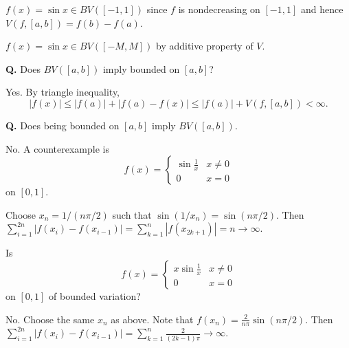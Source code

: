 \documentclass{notes}
\begin{document}
  \begin{eg}
    $f(x) = \sin x \in BV([-1, 1])$ since $f$ is nondecreasing on $[-1, 1]$ and hence $V(f, [a, b]) = f(b) - f(a)$.
  \end{eg}
  
  \begin{eg}
    $f(x) = \sin x \in BV([-M, M])$ by additive property of $V$.
  \end{eg}
  
  {\boldmath \bfseries Q.} Does $BV([a, b])$ imply bounded on $[a, b]$?

  Yes.
  By triangle inequality, 
  \[
    \left | f(x) \right | \leq \left | f(a) \right | + \left | f(a) - f(x) \right | \leq \left | f(a) \right | + V(f, [a, b]) < \infty.
  \]
  
  {\boldmath \bfseries Q.} Does being bounded on $[a, b]$ imply $BV([a, b])$.

  No.
  A counterexample is 
  \[
    f(x) = \begin{cases}
      \sin \frac{1}{x} & x \neq 0 \\ 
      0 & x = 0
    \end{cases}
  \]
  on $[0, 1]$.
  
  Choose $x_n = 1 / (n \pi / 2)$ such that $\sin(1 / x_n) = \sin(n \pi / 2)$.
  Then $\sum_{i = 1}^{2 n} \left | f(x_i) - f(x_{i - 1}) \right | = \sum_{k = 1}^n \left | f(x_{2 k + 1}) \right | = n \to \infty$.
  
  \begin{eg}
    Is 
    \[
      f(x) = \begin{cases}
        x \sin \frac{1}{x} & x \neq 0 \\ 
        0 & x = 0
      \end{cases}
    \]
    on $[0, 1]$ of bounded variation?
    
    No.
    Choose the same $x_n$ as above.
    Note that $f(x_n) = \frac{2}{n \pi} \sin(n \pi / 2)$.
    Then $\sum_{i = 1}^{2 n} \left | f(x_i) - f(x_{i - 1}) \right | = \sum_{k = 1}^n \frac{2}{(2 k - 1) \pi} \to \infty$.
  \end{eg}
  
\end{document}
